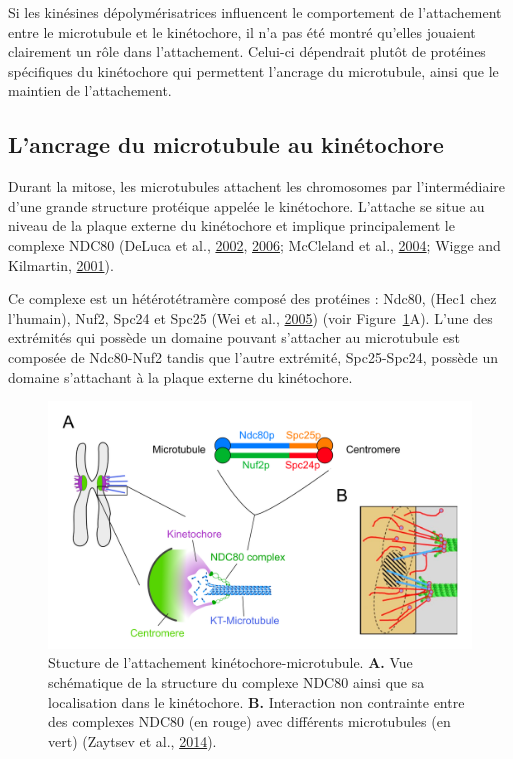\documentclass[12pt,a4paper,twoside,openright]{book}
\begin{document}
Si les kinésines dépolymérisatrices influencent le comportement de
l'attachement entre le microtubule et le kinétochore, il n'a pas été
montré qu'elles jouaient clairement un rôle dans l'attachement. Celui-ci
dépendrait plutôt de protéines spécifiques du kinétochore qui permettent
l'ancrage du microtubule, ainsi que le maintien de l'attachement.

\subsection{L'ancrage du microtubule au
kinétochore}\label{lancrage-du-microtubule-au-kinuxe9tochore}

Durant la mitose, les microtubules attachent les chromosomes par
l'intermédiaire d'une grande structure protéique appelée le kinétochore.
L'attache se situe au niveau de la plaque externe du kinétochore et
implique principalement le complexe NDC80 (DeLuca et al.,
\protect\hyperlink{ref-DeLuca2002}{2002},
\protect\hyperlink{ref-DeLuca2006}{2006}; McCleland et al.,
\protect\hyperlink{ref-McCleland2004}{2004}; Wigge and Kilmartin,
\protect\hyperlink{ref-Wigge2001}{2001}).

Ce complexe est un hétérotétramère composé des protéines : Ndc80, (Hec1
chez l'humain), Nuf2, Spc24 et Spc25 (Wei et al.,
\protect\hyperlink{ref-Wei2005}{2005}) (voir Figure~\ref{fig:ndc80}A).
L'une des extrémités qui possède un domaine pouvant s'attacher au
microtubule est composée de Ndc80-Nuf2 tandis que l'autre extrémité,
Spc25-Spc24, possède un domaine s'attachant à la plaque externe du
kinétochore.

\begin{figure}[htbp]
\centering
\includegraphics{figures/intro/ndc80.png}
\caption[Stucture de l'attachement kinétochore-microtubule]{\label{fig:ndc80}Stucture
de l'attachement kinétochore-microtubule. \textbf{A.} Vue schématique de
la structure du complexe NDC80 ainsi que sa localisation dans le
kinétochore. \textbf{B.} Interaction non contrainte entre des complexes
NDC80 (en rouge) avec différents microtubules (en vert) (Zaytsev et al.,
\protect\hyperlink{ref-Zaytsev2014}{2014}).}
\end{figure}
\end{document}
